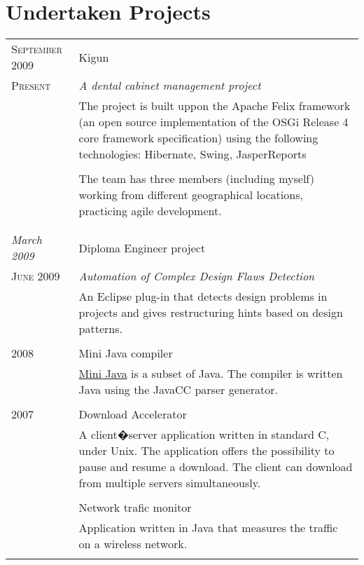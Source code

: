 \documentclass[a4paper,10pt]{article}
\begin{document}
\section{Undertaken Projects}
\begin{longtable}{p{2.5cm}|p{11cm}}
 \raggedleft \textsc{September 2009} & Kigun \\
 \raggedleft \textsc{Present} & \emph{A dental cabinet management project} \\
 & \footnotesize{The project is built uppon the Apache Felix framework (an open
 source implementation of the OSGi Release 4 core framework specification)
 using the following technologies: Hibernate, Swing, JasperReports} \\ \\
 & \footnotesize{The team has three members (including myself) working from
 different geographical locations, practicing agile development.} \\ \\
 \multicolumn{2}{c}{} \\ \raggedleft \emph{March 2009} & Diploma Engineer
 project \\ \raggedleft \textsc{June 2009} & \emph{Automation of Complex Design Flaws Detection} \\
 &\footnotesize{An Eclipse plug-in that detects design problems in projects and gives restructuring hints based on design patterns.}\\
 \multicolumn{2}{c}{} \\ 
 \raggedleft \textsc{2008} & Mini Java compiler \\ &
 \footnotesize{\href{http://compilers.cs.ucla.edu/vids/MCIIJ2E}{Mini Java} is a
 subset of Java. The compiler is written Java using the JavaCC parser
 generator.} \\ 
 \multicolumn{2}{c}{} \\ 
 \raggedleft \textsc{2007} & Download Accelerator \\& \footnotesize{A 
 client�server application written in standard C, under Unix. The application
 offers the possibility to pause and resume a download. The client can download
 from multiple servers simultaneously.}\\ 
 \multicolumn{2}{c}{} \\ 
 & Network trafic monitor \\ 
 & \footnotesize{Application written in Java that measures the traffic on a
 wireless network.} \\ 
 \multicolumn{2}{c}{} \\

\end{longtable}
\end{document}

